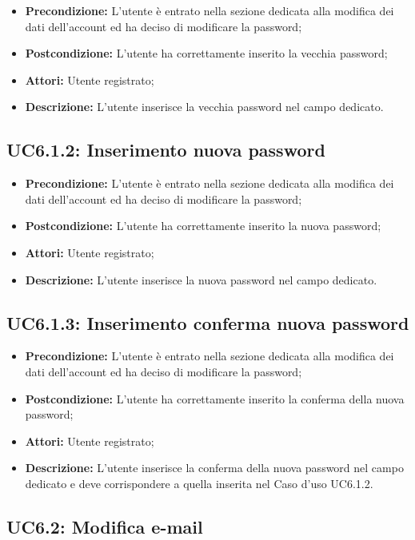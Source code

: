 \begin{itemize}
	\item \textbf{Precondizione:} L’utente è entrato nella sezione dedicata alla modifica dei dati dell’account ed ha deciso di modificare la password;
	\item \textbf{Postcondizione:} L’utente ha correttamente inserito la vecchia password;
	\item \textbf{Attori:} Utente registrato;
	\item \textbf{Descrizione:} L’utente inserisce la vecchia password nel campo dedicato.
\end{itemize}
\subsection{ UC6.1.2: Inserimento nuova password}

\begin{itemize}
	\item \textbf{Precondizione:} L’utente è entrato nella sezione dedicata alla modifica dei dati dell’account ed ha deciso di modificare la password;
	\item \textbf{Postcondizione:}  L’utente ha correttamente inserito la nuova password;
	\item \textbf{Attori:} Utente registrato;
	\item \textbf{Descrizione:} L’utente inserisce la nuova password nel campo dedicato.
\end{itemize}
\subsection{ UC6.1.3: Inserimento conferma nuova password}

\begin{itemize}
	\item \textbf{Precondizione:} L’utente è entrato nella sezione dedicata alla modifica dei dati dell’account ed ha deciso di modificare la password;
	\item \textbf{Postcondizione:} L’utente ha correttamente inserito la conferma della nuova password;
	\item \textbf{Attori:} Utente registrato;
	\item \textbf{Descrizione:} L’utente inserisce la conferma della nuova password nel campo dedicato e deve corrispondere a quella inserita nel Caso d’uso UC6.1.2.
\end{itemize}
\subsection{ UC6.2: Modifica e-mail}

